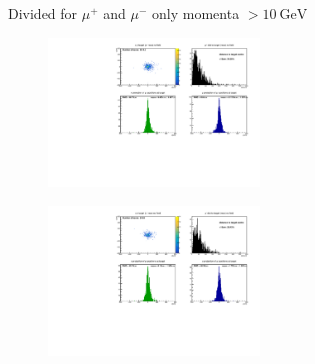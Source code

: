 \begin{frame}[t]{Divided for $\mu^+$ and $\mu^-$ only momenta $> \SI{10}{\giga\electronvolt}$}
  \begin{multicols}{2}
    \begin{figure}
      \centering
      \includegraphics[width=0.5\textwidth]{../hists/nofield/P/target_dist_amu.pdf}
    \end{figure}
    \columnbreak
    \begin{figure}
      \centering
      \includegraphics[width=0.5\textwidth]{../hists/nofield/P/target_dist_mu.pdf}
    \end{figure}
  \end{multicols}
\end{frame}

